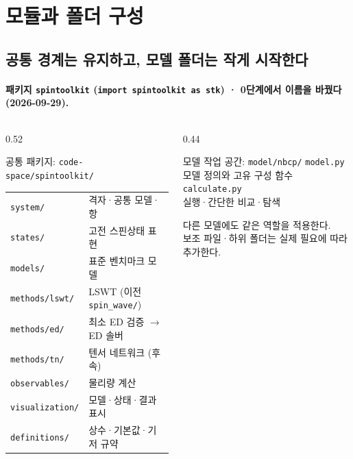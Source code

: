 
\section{모듈과 폴더 구성}



\subsection{공통 경계는 유지하고, 모델 폴더는 작게 시작한다}\label{folder-plan}
\begingroup%
  \framesubtitle{패키지 \texttt{spintoolkit} (\texttt{import spintoolkit as stk}) · 0단계에서 이름을 바꿨다(2026-09-29).}
  \begin{columns}[T,onlytextwidth]
    \begin{column}{0.52\textwidth}
      \begin{block}{공통 패키지: \texttt{code-space/spintoolkit/}}
        \small
        \begin{tabular}{@{}ll@{}}
          \texttt{system/} & 격자·공통 모델·항 \\
          \texttt{states/} & 고전 스핀상태 표현 \\
          \texttt{models/} & 표준 벤치마크 모델 \\
          \texttt{methods/lswt/} & LSWT (이전 \texttt{spin\_wave/}) \\
          \texttt{methods/ed/} & 최소 ED 검증 $\to$ ED 솔버 \\
          \texttt{methods/tn/} & 텐서 네트워크 (후속) \\
          \texttt{observables/} & 물리량 계산 \\
          \texttt{visualization/} & 모델·상태·결과 표시 \\
          \texttt{definitions/} & 상수·기본값·기저 규약
        \end{tabular}
      \end{block}
    \end{column}
    \begin{column}{0.44\textwidth}
      \begin{block}{모델 작업 공간: \texttt{model/nbcp/}}
        \texttt{model.py}\\
        모델 정의와 고유 구성 함수\\[0.8em]
        \texttt{calculate.py}\\
        실행·간단한 비교·탐색
      \end{block}
      \smallskip
      다른 모델에도 같은 역할을 적용한다.\\
      보조 파일·하위 폴더는 실제 필요에 따라 추가한다.
    \end{column}
  \end{columns}
